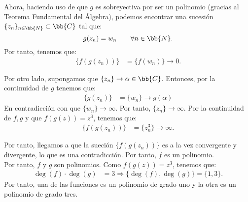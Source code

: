 \documentclass[12pt]{article}
\begin{document}
\begin{ejercicio}[2.5 puntos]
        Ahora, haciendo uso de que $g$ es sobreyectiva por ser un polinomio (gracias al Teorema Fundamental del Álgebra), podemos encontrar una sucesión $\{z_n\}_{n\in \bb{N}}\subset \bb{C}$ tal que:
        \begin{equation*}
            g(z_n) = w_n\qquad \forall n\in \bb{N}.
        \end{equation*}
        Por tanto, tenemos que:
        \begin{align*}
            \{f(g(z_n))\} &= \{f(w_n)\} \to 0.
        \end{align*}

        Por otro lado, supongamos que $\{z_n\}\to \alpha\in \bb{C}$. Entonces, por la continuidad de $g$ tenemos que:
        \begin{align*}
            \{g(z_n)\} &= \{w_n\} \to g(\alpha)
        \end{align*}
        En contradicción con que $\{w_n\}\to \infty$. Por tanto, $\{z_n\}\to \infty$. Por la continuidad de $f, g$ y que $f(g(z))=z^3$, tenemos que:
        \begin{align*}
            \{f(g(z_n))\} &= \{z_n^3\} \to \infty.
        \end{align*}

        Por tanto, llegamos a que la sueción $\{f(g(z_n))\}$ es a la vez convergente y divergente, lo que es una contradicción. Por tanto, $f$ es un polinomio.\\

        Por tanto, $f$ y $g$ son polinomios. Como $f(g(z))=z^3$, tenemos que:
        \begin{align*}
            \deg(f)\cdot \deg(g) &= 3
            \Longrightarrow
            \{\deg(f), \deg(g)\} = \{1, 3\}.
        \end{align*}
        Por tanto, una de las funciones es un polinomio de grado uno y la otra es un polinomio de grado tres.
    \end{ejercicio}
\end{document}
